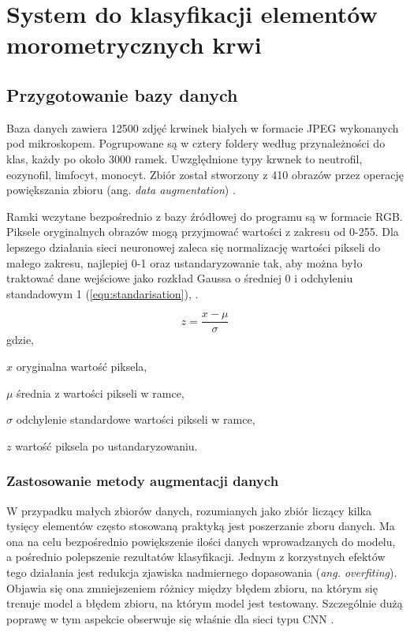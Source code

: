 \chapter{System do klasyfikacji elementów morometrycznych krwi}
\label{cha:system_do_klasyfikacji_elementow_morfologicznych}

\section{Przygotowanie bazy danych}
\label{przygotowanie_danych}

Baza danych zawiera 12500 zdjęć krwinek białych w formacie JPEG wykonanych pod mikroskopem. Pogrupowane są w cztery foldery według przynależności do klas, każdy po około 3000 ramek. Uwzględnione typy krwnek to neutrofil, eozynofil, limfocyt, monocyt. Zbiór został stworzony z 410 obrazów przez operację powiększania zbioru (ang. \textit{data augmentation}) \cite{database_kaggle}.

{\parindent0pt %
Ramki wczytane bezpośrednio z bazy źródłowej do programu są w formacie RGB. Piksele oryginalnych obrazów mogą przyjmować wartości z zakresu od 0-255. Dla lepszego działania sieci neuronowej zaleca się normalizację wartości pikseli do małego zakresu, najlepiej 0-1 oraz ustandaryzowanie tak, aby można było traktować dane wejściowe jako rozkład Gaussa o średniej 0 i odchyleniu standadowym 1 (\ref{equ:standarisation}), \cite{standarisation}.

\begin{equation}
z =  \frac{x - \mu}{\sigma} 
\label{equ:standarisation}
\end{equation}
gdzie,
\begin{eqwhere}[2cm]
	\item[$x$] oryginalna wartość piksela,
	\item[$\mu$] średnia z wartości pikseli w ramce,
	\item[$\sigma$] odchylenie standardowe wartości pikseli w ramce,
	\item[$z$] wartość piksela po ustandaryzowaniu.
\end{eqwhere}
}

\subsection{Zastosowanie metody augmentacji danych}
W przypadku małych zbiorów danych, rozumianych jako zbiór liczący kilka tysięcy elementów często stosowaną praktyką jest poszerzanie zboru danych. Ma ona na celu bezpośrednio powiększenie ilości danych wprowadzanych do modelu, a pośrednio polepszenie rezultatów klasyfikacji. Jednym z korzystnych efektów tego działania jest redukcja zjawiska nadmiernego dopasowania (\textit{ang. overfiting}). Objawia się ona zmniejszeniem różnicy między błędem zbioru, na którym się trenuje model a błędem zbioru, na którym model jest testowany. Szczególnie dużą poprawę w tym aspekcie obserwuje się właśnie dla sieci typu CNN \cite{Wong2016UnderstandingDA}.


